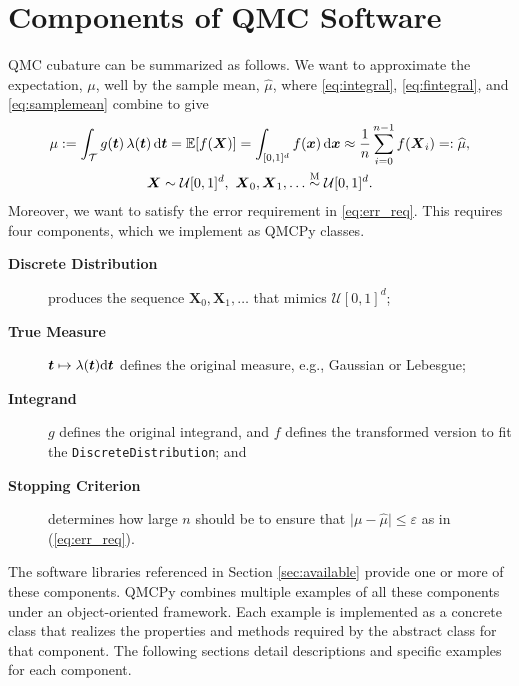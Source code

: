 \documentclass[graybox]{svmult}
\begin{document}
\section{Components of QMC Software}
QMC cubature can be summarized as follows.  We want to approximate the expectation, $\mu$, well by the sample mean, $\widehat{\mu}$, where \eqref{eq:integral}, \eqref{eq:fintegral}, and \eqref{eq:samplemean} combine to give
\begin{multline} \label{eq:cubSummary}
	\mu : = \int_\mathcal{T} g(\boldsymbol{t}) \, \lambda(\boldsymbol{t}) \, \D \boldsymbol{t}  = \mathbb{E}[f(\boldsymbol{X})] = \int_{[0,1]^d} f(\boldsymbol{x}) \, \D \boldsymbol{x} \approx \frac 1n \sum_{i=0}^{n-1} f(\boldsymbol{X}_i) =: \widehat{\mu}, \\
	 \boldsymbol{X} \sim \mathcal{U}[0,1]^d, \ \boldsymbol{X}_0, \boldsymbol{X}_1, \ldots \overset{\textup{M}}{\sim} \mathcal{U}[0,1]^d.
\end{multline}
Moreover, we want to satisfy the error requirement in \eqref{eq:err_req}.
This requires four components, which we implement as QMCPy classes.

\begin{description}%
	
	\item[\textbf{Discrete Distribution}]  produces the sequence $\boldsymbol{X}_0, \boldsymbol{X}_1, \dots$ that mimics $\mathcal{U}[0,1]^d$;
	
	\item[\textbf{True Measure}] $\boldsymbol{t} \mapsto \lambda (\boldsymbol{t}) \mathrm{d} \boldsymbol{t}$  defines the original measure, e.g., Gaussian or Lebesgue;
	
	\item[\textbf{Integrand}] $g$  defines the original integrand, and $f$ defines the transformed version to fit the \texttt{DiscreteDistribution}; and
	
	\item[\textbf{Stopping Criterion}] determines how large $n$ should be to ensure that $\lvert \mu - \widehat{\mu}\rvert \le \varepsilon$ as in (\ref{eq:err_req}).
\end{description}

The software libraries referenced in Section \ref{sec:available} provide one or more of these components. QMCPy combines multiple examples of all these components under an object-oriented framework. Each example is implemented as a concrete class that realizes the properties and methods required by the abstract class for that component. The following sections detail descriptions and specific examples for each component. 
\end{document}
